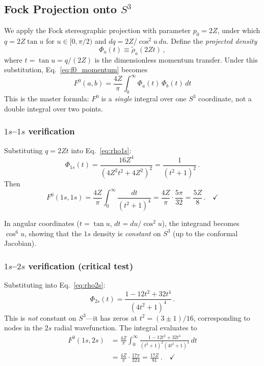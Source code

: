 \subsection{Fock Projection onto $S^3$}

We apply the Fock stereographic projection with parameter $p_0 = 2Z$,
under which $q = 2Z \tan u$ for $u \in [0, \pi/2)$ and
$dq = 2Z/\cos^2 u \, du$. Define the \emph{projected density}
\begin{equation}
  \Phi_a(t) \equiv \tilde{\rho}_a(2Zt) \,,
  \label{eq:projected_density}
\end{equation}
where $t = \tan u = q/(2Z)$ is the dimensionless momentum transfer.
Under this substitution, Eq.~\eqref{eq:f0_momentum} becomes
\begin{equation}
  \boxed{
    F^0(a,b) = \frac{4Z}{\pi} \int_0^\infty
    \Phi_a(t) \, \Phi_b(t) \, dt
  }
  \label{eq:f0_s3}
\end{equation}
This is the master formula: $F^0$ is a \emph{single} integral over one
$S^3$ coordinate, not a double integral over two points.

\subsubsection{$1s$--$1s$ verification}

Substituting $q = 2Zt$ into Eq.~\eqref{eq:rho1s}:
\begin{equation}
  \Phi_{1s}(t) = \frac{16Z^4}{(4Z^2 t^2 + 4Z^2)^2}
  = \frac{1}{(t^2 + 1)^2} \,.
  \label{eq:phi1s}
\end{equation}
Then
\begin{equation}
  F^0(1s,1s) = \frac{4Z}{\pi} \int_0^\infty
  \frac{dt}{(t^2+1)^4}
  = \frac{4Z}{\pi} \cdot \frac{5\pi}{32}
  = \frac{5Z}{8} \,. \quad\checkmark
\end{equation}

In angular coordinates ($t = \tan u$, $dt = du/\cos^2 u$),
the integrand becomes $\cos^6 u$, showing that the $1s$ density
is \emph{constant} on $S^3$ (up to the conformal Jacobian).

\subsubsection{$1s$--$2s$ verification (critical test)}

Substituting into Eq.~\eqref{eq:rho2s}:
\begin{equation}
  \Phi_{2s}(t) = \frac{1 - 12t^2 + 32t^4}{(4t^2 + 1)^4} \,.
  \label{eq:phi2s}
\end{equation}
This is \emph{not} constant on $S^3$---it has zeros at
$t^2 = (3 \pm 1)/16$, corresponding to nodes in the $2s$ radial
wavefunction. The integral evaluates to
\begin{align}
  F^0(1s,2s) &= \frac{4Z}{\pi} \int_0^\infty
  \frac{1 - 12t^2 + 32t^4}{(t^2+1)^2 (4t^2+1)^4} \, dt \nonumber\\
  &= \frac{4Z}{\pi} \cdot \frac{17\pi}{324}
  = \frac{17Z}{81} \,. \quad\checkmark
\end{align}

